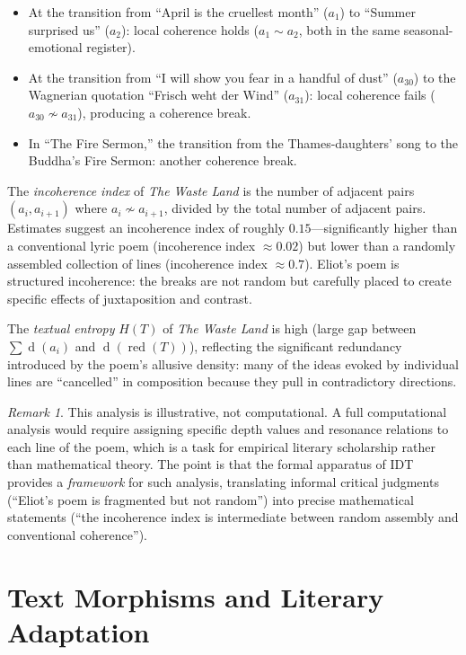 \documentclass[11pt,openany]{book}
\theoremstyle{definition}
\theoremstyle{plain}
\theoremstyle{remark}
\newtheorem{remark}[axiom]{Remark}
\newcommand{\res}{\sim}                      %
\newcommand{\depth}{\operatorname{d}}       %
\begin{document}
\begin{itemize}
\item At the transition from ``April is the cruellest month'' ($a_1$) to ``Summer surprised us'' ($a_2$): local coherence holds ($a_1 \res a_2$, both in the same seasonal-emotional register).
\item At the transition from ``I will show you fear in a handful of dust'' ($a_{30}$) to the Wagnerian quotation ``Frisch weht der Wind'' ($a_{31}$): local coherence fails ($a_{30} \not\res a_{31}$), producing a coherence break.
\item In ``The Fire Sermon,'' the transition from the Thames-daughters' song to the Buddha's Fire Sermon: another coherence break.
\end{itemize}

The \emph{incoherence index} of \emph{The Waste Land} is the number of adjacent pairs $(a_i, a_{i+1})$ where $a_i \not\res a_{i+1}$, divided by the total number of adjacent pairs. Estimates suggest an incoherence index of roughly $0.15$---significantly higher than a conventional lyric poem (incoherence index $\approx 0.02$) but lower than a randomly assembled collection of lines (incoherence index $\approx 0.7$). Eliot's poem is structured incoherence: the breaks are not random but carefully placed to create specific effects of juxtaposition and contrast.

The \emph{textual entropy} $H(T)$ of \emph{The Waste Land} is high (large gap between $\sum \depth(a_i)$ and $\depth(\operatorname{red}(T))$), reflecting the significant redundancy introduced by the poem's allusive density: many of the ideas evoked by individual lines are ``cancelled'' in composition because they pull in contradictory directions.

\begin{remark}
This analysis is illustrative, not computational. A full computational analysis would require assigning specific depth values and resonance relations to each line of the poem, which is a task for empirical literary scholarship rather than mathematical theory. The point is that the formal apparatus of IDT provides a \emph{framework} for such analysis, translating informal critical judgments (``Eliot's poem is fragmented but not random'') into precise mathematical statements (``the incoherence index is intermediate between random assembly and conventional coherence'').
\end{remark}

\section{Text Morphisms and Literary Adaptation}
\end{document}
